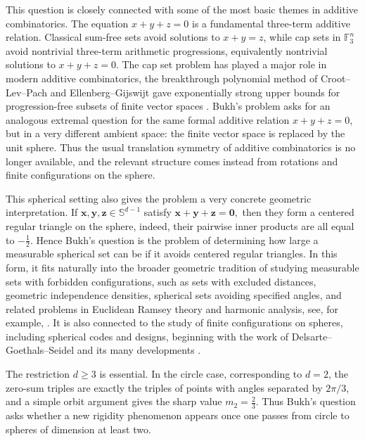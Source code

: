 \documentclass[11pt]{article}
\theoremstyle{definition}
\begin{document}
This question is closely connected with some of the most basic themes in
additive combinatorics.  The equation \(x+y+z=0\) is a fundamental
three-term additive relation.  Classical sum-free sets avoid solutions to
\(x+y=z\), while cap sets in \(\mathbb F_3^n\) avoid nontrivial
three-term arithmetic progressions, equivalently nontrivial solutions to
\(x+y+z=0\).  The cap set problem has played a major role in modern
additive combinatorics, the breakthrough polynomial method of
Croot--Lev--Pach and Ellenberg--Gijswijt gave exponentially strong upper
bounds for progression-free subsets of finite vector spaces
\cite{CrootLevPach2017,EllenbergGijswijt2017}. 
Bukh's problem asks for
an analogous extremal question for the same formal additive relation  \(x+y+z=0\), but in
a very different ambient space: the finite vector space is replaced by
the unit sphere.  
Thus the usual translation symmetry of additive
combinatorics is no longer available, and the relevant structure comes
instead from rotations and finite configurations on the sphere.

This spherical setting also gives the problem a very concrete geometric
interpretation.  If
\(\boldsymbol{x},\boldsymbol{y},\boldsymbol{z}\in\mathbb S^{d-1}\) satisfy
\(\boldsymbol{x}+\boldsymbol{y}+\boldsymbol{z}=\boldsymbol{0},
\)
then they form a centered regular triangle on the sphere, indeed,
their pairwise inner products are all equal to \(-\frac{1}{2}\).  Hence
Bukh's question is the problem of determining how large a measurable
spherical set can be if it avoids centered regular triangles.  In this
form, it fits naturally into the broader geometric tradition of studying
measurable sets with forbidden configurations, such as sets with excluded
distances, geometric independence densities, spherical sets avoiding
specified angles, and related problems in Euclidean Ramsey theory and
harmonic analysis, see, for example,
\cite{Bukh2008,CastroSilva2023,DeCortePikhurko2018}.  It is also
connected to the study of finite configurations on spheres, including
spherical codes and designs, beginning with the work of
Delsarte--Goethals--Seidel and its many developments
\cite{BondarenkoRadchenkoViazovska2013,DelsarteGoethalsSeidel1977}.

The restriction \(d\ge3\) is essential.  
In the circle case,
corresponding to \(d=2\), the zero-sum triples are exactly the triples of
points with angles separated by \(2\pi/3\), and a simple orbit argument
gives the sharp value \(m_2=\frac{2}{3}\).  
Thus Bukh's question asks
whether a new rigidity phenomenon appears once one passes from circle to spheres of dimension
at least two.
\end{document}
